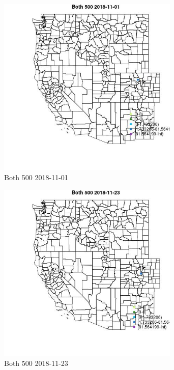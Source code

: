 \begin{figure} 
\centering  
\includegraphics[width=0.77\textwidth]{Code_Outputs/Report_ML_input_PM25_Step4_part_e_de_duplicated_aves_MapObsBoth_5002018-11-01.jpg} 
\caption{\label{fig:Report_ML_input_PM25_Step4_part_e_de_duplicated_avesMapObsBoth_5002018-11-01}Both 500 2018-11-01} 
\end{figure} 
 

\clearpage 

\begin{figure} 
\centering  
\includegraphics[width=0.77\textwidth]{Code_Outputs/Report_ML_input_PM25_Step4_part_e_de_duplicated_aves_MapObsBoth_5002018-11-23.jpg} 
\caption{\label{fig:Report_ML_input_PM25_Step4_part_e_de_duplicated_avesMapObsBoth_5002018-11-23}Both 500 2018-11-23} 
\end{figure} 
 

